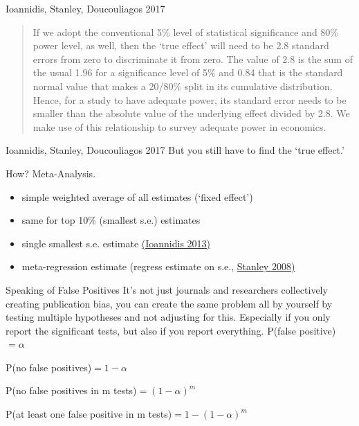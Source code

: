 \documentclass{beamer}
\begin{document}
\begin{frame}{Ioannidis, Stanley, Doucouliagos 2017}
\begin{quote}If we adopt the conventional 5\% level of statistical significance and 80\% power
level, as well, then the `true effect' will need to be 2.8 standard errors from zero to
discriminate it from zero. The value of 2.8 is the sum of the usual 1.96 for a
significance level of 5\% and 0.84 that is the standard normal value that makes a 20/80\% split in its cumulative distribution. Hence, for a study to have adequate power, its
standard error needs to be smaller than the absolute value of the underlying effect
divided by 2.8. We make use of this relationship to survey adequate power in
economics.
\end{quote}
\end{frame}

\begin{frame}{Ioannidis, Stanley, Doucouliagos 2017}
But you still have to find the `true effect.' 

How? Meta-Analysis.
\begin{itemize}
\item simple weighted average of all estimates (`fixed effect')
\item same for top 10\% (smallest s.e.) estimates
\item single smallest s.e. estimate \href{https://www.sciencedirect.com/science/article/pii/S0022249613000278}{(Ioannidis 2013)}
\item meta-regression estimate (regress estimate on s.e., \href{http://onlinelibrary.wiley.com/doi/10.1111/j.1468-0084.2007.00487.x/full}{Stanley 2008)}
\end{itemize}
\end{frame}

\begin{frame}{Speaking of False Positives}
It's not just journals and researchers collectively creating publication bias, you can create the same problem all by yourself by testing multiple hypotheses and not adjusting for this. Especially if you only report the significant tests, but also if you report everything.
\vskip0.25in
P(false positive)$=\alpha$

P(no false positives)$=1-\alpha$

P(no false positives in m tests)$=(1-\alpha)^m$

P(at least one false positive in m tests)$=1-(1-\alpha)^m$
\end{frame}
\end{document}
